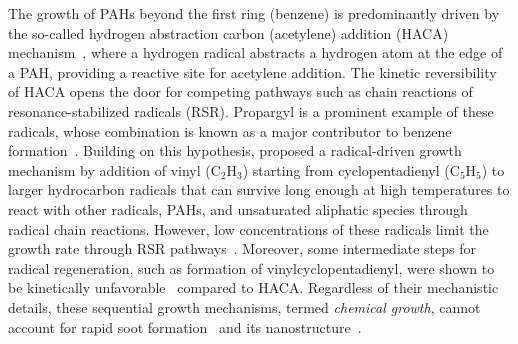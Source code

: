 
The growth of PAHs beyond the first ring (benzene) is predominantly driven by the so-called hydrogen abstraction carbon (acetylene) addition (HACA) mechanism~\citep{frenklach2002reaction}, where a hydrogen radical abstracts a hydrogen atom at the edge of a PAH, providing a reactive site for acetylene addition. The kinetic reversibility of HACA opens the door for competing pathways such as chain reactions of resonance-stabilized radicals (RSR). Propargyl is a prominent example of these radicals, whose combination is known as a major contributor to benzene formation~\citep{fahr1989reactions}. Building on this hypothesis, \citet{johansson2018resonance} proposed a radical-driven growth mechanism by addition of vinyl ($\mathrm{C_2H_3}$) starting from cyclopentadienyl ($\mathrm{C_5H_5}$) to larger hydrocarbon radicals that can survive long enough at high temperatures to react with other radicals, PAHs, and unsaturated aliphatic species through radical chain reactions. However, low concentrations of these radicals limit the growth rate through RSR pathways~\citep{frenklach2020mechanism}. Moreover, some intermediate steps for radical regeneration, such as formation of vinylcyclopentadienyl, were shown to be kinetically unfavorable~\citep{frenklach2020mechanism} compared to HACA. Regardless of their mechanistic details, these sequential growth mechanisms, termed \textit{chemical growth}, cannot account for rapid soot formation~\citep{frenklach2002reaction} and its nanostructure~\citep{frenklach1988comment}.

